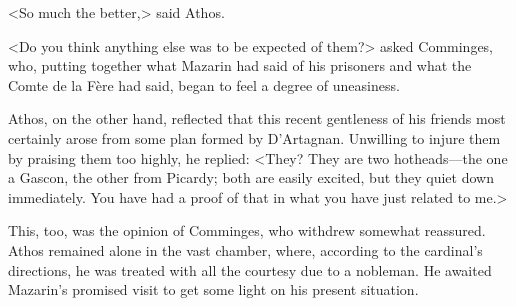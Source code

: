 <So much the better,> said Athos.

<Do you think anything else was to be expected of them?> asked Comminges, who, putting together what Mazarin had said of his prisoners and what the Comte de la Fère had said, began to feel a degree of uneasiness.

Athos, on the other hand, reflected that this recent gentleness of his friends most certainly arose from some plan formed by D'Artagnan. Unwilling to injure them by praising them too highly, he replied: <They? They are two hotheads—the one a Gascon, the other from Picardy; both are easily excited, but they quiet down immediately. You have had a proof of that in what you have just related to me.>

This, too, was the opinion of Comminges, who withdrew somewhat reassured. Athos remained alone in the vast chamber, where, according to the cardinal's directions, he was treated with all the courtesy due to a nobleman. He awaited Mazarin's promised visit to get some light on his present situation. 